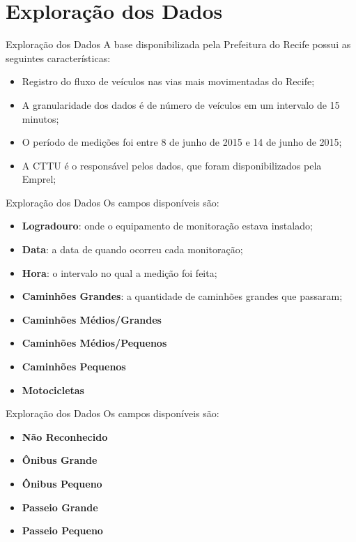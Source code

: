 \section{Exploração dos Dados}

\begin{frame}{Exploração dos Dados}
A base disponibilizada pela Prefeitura do Recife possui as seguintes
características:
\begin{itemize}
	\item Registro do fluxo de veículos nas vias mais movimentadas do Recife;
	\item A granularidade dos dados é de número de veículos em um intervalo
	de 15 minutos;
	\item O período de medições foi entre 8 de junho de 2015 e 14 de junho
	de 2015;
	\item A CTTU é o responsável pelos dados, que foram disponibilizados
	pela Emprel;
\end{itemize}
\end{frame}

\begin{frame}{Exploração dos Dados}
Os campos disponíveis são:
\begin{itemize}
	\item \textbf{Logradouro}: onde o equipamento de monitoração estava
	instalado;
	\item \textbf{Data}: a data de quando ocorreu cada monitoração;
	\item \textbf{Hora}: o intervalo no qual a medição foi feita;
	\item \textbf{Caminhões Grandes}: a quantidade de caminhões grandes que
	passaram;
	\item \textbf{Caminhões Médios/Grandes}
	\item \textbf{Caminhões Médios/Pequenos}
	\item \textbf{Caminhões Pequenos}
	\item \textbf{Motocicletas}
\end{itemize}
\end{frame}

\begin{frame}{Exploração dos Dados}
Os campos disponíveis são:
\begin{itemize}
	\item \textbf{Não Reconhecido}
	\item \textbf{Ônibus Grande}
	\item \textbf{Ônibus Pequeno}
	\item \textbf{Passeio Grande}
	\item \textbf{Passeio Pequeno}
\end{itemize}
\end{frame}

